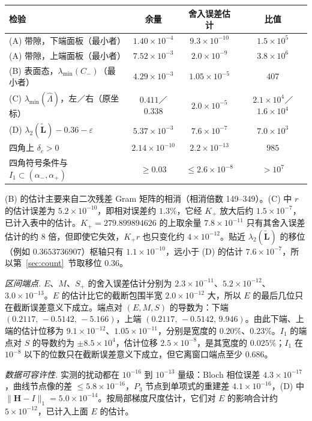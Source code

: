 \documentclass[11pt,a4paper,fontset=fandol]{ctexart}
\begin{document}
\begin{center}
\small
\begin{tabular}{lccc}
\toprule
检验 & 余量 & 舍入误差估计 & 比值 \\
\midrule
(A) 带隙，下端面板（最小者） & $1.40\times10^{-4}$ & $9.3\times10^{-10}$ & $1.5\times10^5$ \\
(A) 带隙，上端面板（最小者） & $7.52\times10^{-3}$ & $2.0\times10^{-9}$ & $3.8\times10^6$ \\
(B) 表面态，$\lambda_{\min}(C_-)$（最小者） & $4.29\times10^{-3}$ & $1.05\times10^{-5}$ & $407$ \\
(C) $\lambda_{\min}(\hat\Lambda)$，左／右（原坐标） & $0.411$／$0.338$ & $2.0\times10^{-5}$ & $2.1\times10^4$／$1.6\times10^4$ \\
(D) $\lambda_2(\tilde{\bm L})-0.36-\varepsilon$ & $5.37\times10^{-3}$ & $7.6\times10^{-7}$ & $7.0\times10^3$ \\
四角上 $\delta_c>0$ & $2.14\times10^{-10}$ & $2.2\times10^{-13}$ & $985$ \\
四角符号条件与 $I_1\subset(\alpha_-,\alpha_+)$ & $\ge0.03$ & $\le2.6\times10^{-8}$ & $>10^7$ \\
\bottomrule
\end{tabular}
\end{center}
(B) 的估计主要来自二次残差 Gram 矩阵的相消（相消倍数 149--349）。(C) 中 $r$ 的估计误差为 $5.2\times10^{-10}$，即相对误差约 $1.3\%$，它经 $K_+$ 放大后约 $1.5\times10^{-7}$，已计入表中的估计。$K_+=279.899894626$ 的上取余量 $7.8\times10^{-11}$ 只有其舍入误差估计的约 8 倍，但即使它失效，$K_+r$ 也只变化约 $4\times10^{-12}$。贴近 $\lambda_2(\tilde{\bm L})$ 的移位（例如 $0.3653736907$）枢轴只有 $1.1\times10^{-10}$，远小于 (D) 的估计 $7.6\times10^{-7}$，所以第~\ref{sec:count}~节取移位 $0.36$。

\emph{区间端点.} $E$、$M$、$S_+$ 的舍入误差估计分别为 $2.3\times10^{-11}$、$5.2\times10^{-12}$、$3.0\times10^{-13}$。$E$ 的估计比它的截断包围半宽 $2.0\times10^{-12}$ 大，所以 $E$ 的最后几位只在截断误差意义下成立。端点对 $(E,M,S)$ 的导数为：下端 $(0.2117,\,-0.5142,\,-5.166)$，上端 $(0.2117,\,-0.5142,\,9.946)$。由此下端、上端的估计位移为 $9.1\times10^{-12}$、$1.05\times10^{-11}$，分别是宽度的 $0.20\%$、$0.23\%$。$I_1$ 的端点对 $S$ 的导数约为 $\pm8.5\times10^4$，估计位移 $2.5\times10^{-8}$，是其宽度的 $0.025\%$；$I_1$ 在 $10^{-8}$ 以下的位数只在截断误差意义下成立，但它离窗口端点至少 $0.686$。

\emph{数据可容许性.} 实测的扰动都在 $10^{-16}$ 到 $10^{-13}$ 量级：Bloch 相位误差 $4.3\times10^{-17}$，曲线节点像的差 $\le5.8\times10^{-16}$，$P_3$ 节点到单项式的重建差 $4.1\times10^{-16}$，(D) 中 $\|\bm H-I\|_1=5.0\times10^{-14}$。按局部梯度尺度估计，它们对 $E$ 的影响合计约 $5\times10^{-12}$，已计入上面 $E$ 的估计。
\end{document}
